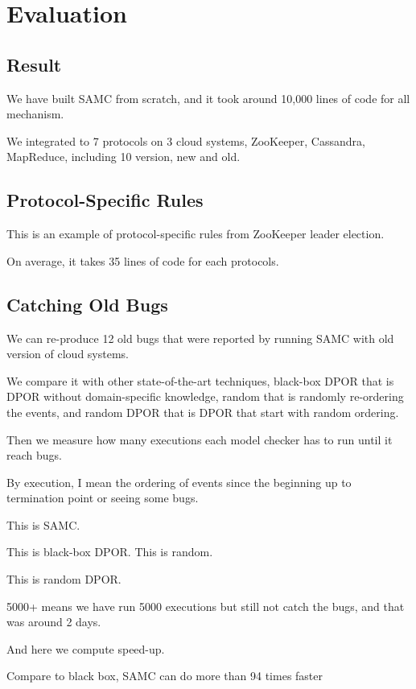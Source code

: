 
\section{Evaluation}

\subsection{Result}

We have built SAMC from scratch, and it took around 10,000 lines of code for all
mechanism.

We integrated to 7 protocols on 3 cloud systems, ZooKeeper, Cassandra,
MapReduce, including 10 version, new and old.

\subsection{Protocol-Specific Rules}

This is an example of protocol-specific rules from ZooKeeper leader election.

On average, it takes 35 lines of code for each protocols.

\subsection{Catching Old Bugs}

We can re-produce 12 old bugs that were reported by running SAMC with old
version of cloud systems.

We compare it with other state-of-the-art techniques, black-box DPOR that is
DPOR without domain-specific knowledge, random that is randomly re-ordering the
events, and random DPOR that is DPOR that start with random ordering.

Then we measure how many executions each model checker has to run until it reach
bugs.

By execution, I mean the ordering of events since the beginning up to
termination point or seeing some bugs.

This is SAMC.

This is black-box DPOR. This is random.

This is random DPOR.

5000+ means we have run 5000 executions but still not catch the bugs, and that
was around 2 days.

And here we compute speed-up.

Compare to black box, SAMC can do more than 94 times faster


